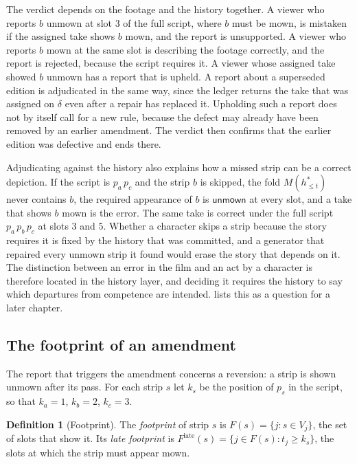\documentclass[11pt,twoside,openright]{book}
\theoremstyle{plain}
\theoremstyle{definition}
\newtheorem{definition}[theorem]{Definition}
\theoremstyle{remark}
\newcommand{\unmown}{\mathsf{unmown}}
\begin{document}
The verdict depends on the footage and the history together. A viewer who reports $b$ unmown at slot $3$ of the full script, where $b$ must be mown, is mistaken if the assigned take shows $b$ mown, and the report is unsupported. A viewer who reports $b$ mown at the same slot is describing the footage correctly, and the report is rejected, because the script requires it. A viewer whose assigned take showed $b$ unmown has a report that is upheld. A report about a superseded edition is adjudicated in the same way, since the ledger returns the take that was assigned on $\delta$ even after a repair has replaced it. Upholding such a report does not by itself call for a new rule, because the defect may already have been removed by an earlier amendment. The verdict then confirms that the earlier edition was defective and ends there.

Adjudicating against the history also explains how a missed strip can be a correct depiction. If the script is $p_a\,p_c$ and the strip $b$ is skipped, the fold $M(h^\ast_{\le t})$ never contains $b$, the required appearance of $b$ is $\unmown$ at every slot, and a take that shows $b$ mown is the error. The same take is correct under the full script $p_a\,p_b\,p_c$ at slots $3$ and $5$. Whether a character skips a strip because the story requires it is fixed by the history that was committed, and a generator that repaired every unmown strip it found would erase the story that depends on it. The distinction between an error in the film and an act by a character is therefore located in the history layer, and deciding it requires the history to say which departures from competence are intended.  lists this as a question for a later chapter.

\subsection{The footprint of an amendment}

The report that triggers the amendment concerns a reversion: a strip is shown unmown after its pass. For each strip $s$ let $k_s$ be the position of $p_s$ in the script, so that $k_a=1$, $k_b=2$, $k_c=3$.

\begin{definition}[Footprint]\label{def:footprint}
The \emph{footprint} of strip $s$ is $F(s)=\{j:s\in V_j\}$, the set of slots that show it. Its \emph{late footprint} is $F^{\mathrm{late}}(s)=\{j\in F(s):t_j\ge k_s\}$, the slots at which the strip must appear mown.
\end{definition}
\end{document}
